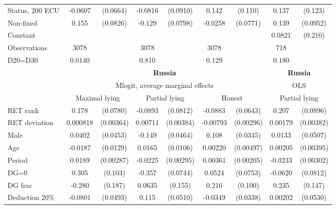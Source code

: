 \begin{tabular}{l|cccccc|cc}
Status, 200 ECU&  -0.0607         & (0.0664)&  -0.0816         & (0.0910)&    0.142         &  (0.110)&    0.137         &  (0.123)\\
Non-fixed     &    0.155\sym{*}  & (0.0826)&   -0.129         & (0.0798)&  -0.0258         & (0.0771)&    0.139         & (0.0952)\\
Constant        &                  &         &                  &         &                  &         &   0.0821         &  (0.210)\\
\hline
Observations    &     3078         &         &     3078         &         &     3078         &         &      718         &         \\
D20=D30         &   0.0140         &         &    0.810         &         &    0.129         &         &    0.180         &         \\
\hline\hline
&\multicolumn{6}{c|}{\bf Russia}&\multicolumn{2}{c}{\bf Russia}\\ &\multicolumn{6}{c|}{Mlogit, average marginal effects }&\multicolumn{2}{c}{OLS}\\
                &\multicolumn{2}{c}{Maximal lying}&\multicolumn{2}{c}{Partial lying}&\multicolumn{2}{c|}{Honest}  &\multicolumn{2}{c}{Partial lying}\\
\hline
RET rank        &    0.178\sym{**} & (0.0780)&  -0.0893         & (0.0812)&  -0.0883         & (0.0643)&    0.207\sym{**} & (0.0896)\\
RET deviation   & 0.000818         &(0.00364)&  0.00711\sym{*}  &(0.00384)& -0.00793\sym{***}&(0.00296)&  0.00179         &(0.00382)\\
Male            &   0.0402         & (0.0453)&   -0.149\sym{***}& (0.0464)&    0.108\sym{***}& (0.0345)&   0.0133         & (0.0507)\\
Age             &  -0.0187         & (0.0129)&   0.0165         & (0.0106)&  0.00220         &(0.00497)&  0.00205         &(0.00395)\\
Period          &   0.0189\sym{***}&(0.00287)&  -0.0225\sym{***}&(0.00295)&  0.00361\sym{*}  &(0.00205)&  -0.0233\sym{***}&(0.00302)\\
DG=0          &    0.305\sym{***}&  (0.103)&   -0.357\sym{***}& (0.0744)&   0.0524         & (0.0753)&  -0.0620         & (0.0812)\\
DG frac         &   -0.280         &  (0.187)&   0.0635         &  (0.155)&    0.216\sym{**} &  (0.100)&    0.235         &  (0.147)\\
Deduction 20\%&  -0.0801         & (0.0493)&    0.115\sym{**} & (0.0510)&  -0.0349         & (0.0338)&  0.00202         & (0.0530)\\

\end{tabular}
